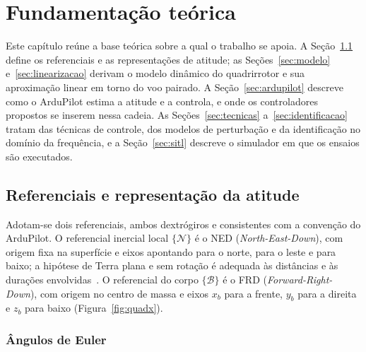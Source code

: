 %
\chapter{Fundamentação teórica}
\label{cap:fundamentacao}

Este capítulo reúne a base teórica sobre a qual o trabalho se apoia. A
Seção~\ref{sec:atitude} define os referenciais e as representações de atitude;
as Seções~\ref{sec:modelo} e~\ref{sec:linearizacao} derivam o modelo dinâmico
do quadrirrotor e sua aproximação linear em torno do voo pairado. A
Seção~\ref{sec:ardupilot} descreve como o ArduPilot estima a atitude e a
controla, e onde os controladores propostos se inserem nessa cadeia. As
Seções~\ref{sec:tecnicas} a~\ref{sec:identificacao} tratam das técnicas de
controle, dos modelos de perturbação e da identificação no domínio da
frequência, e a Seção~\ref{sec:sitl} descreve o simulador em que os ensaios
são executados.

\section{Referenciais e representação da atitude}
\label{sec:atitude}

Adotam-se dois referenciais, ambos dextrógiros e consistentes com a convenção
do ArduPilot. O referencial inercial local $\{\mathcal{N}\}$ é o NED
(\textit{North-East-Down}), com origem fixa na superfície e eixos apontando
para o norte, para o leste e para baixo; a hipótese de Terra plana e sem
rotação é adequada às distâncias e às durações envolvidas~\cite[Cap.~3]{beard2012}. O
referencial do corpo $\{\mathcal{B}\}$ é o FRD (\textit{Forward-Right-Down}),
com origem no centro de massa e eixos $x_b$ para a frente, $y_b$ para a
direita e $z_b$ para baixo (Figura~\ref{fig:quadx}).

\subsection{Ângulos de Euler}

